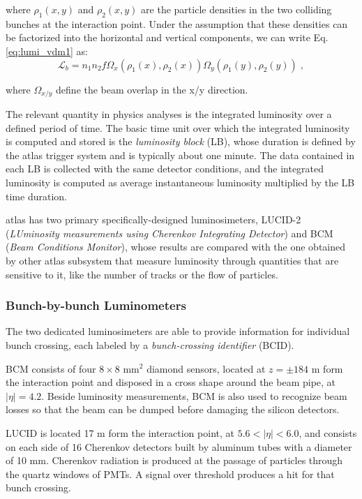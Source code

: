 where $\rho_1(x,y)$ and $\rho_2(x,y)$ are the particle densities in the two colliding bunches at the interaction point. 
Under the assumption that these densities can be factorized into the horizontal and vertical components, we can write Eq. \ref{eq:lumi_vdm1} as:
\begin{equation}
\mathcal{L}_b = n_1 n_2 f  \Omega_x(\rho_1(x), \rho_2(x)) \Omega_y(\rho_1(y), \rho_2(y))  \; ,
\label{eq:lumi_vdm1}
\end{equation}

where $\Omega_{x/y}$ define the beam overlap in the x/y direction.

The relevant quantity in physics analyses is the integrated luminosity over a defined period of time. The basic time unit over which the integrated luminosity is computed and stored is the \textit{luminosity block} (LB), whose duration is defined by the \gls{atlas} trigger system and is typically about one minute. The data contained in each LB is collected with the same detector conditions, and the integrated luminosity is computed as average instantaneous luminosity multiplied by the LB time duration.

\gls{atlas} has two primary specifically-designed luminosimeters, LUCID-2 (\textit{LUminosity measurements using Cherenkov Integrating Detector}) and BCM (\textit{Beam Conditions Monitor}), whose results are compared with the one obtained by other \gls{atlas} subsystem that measure luminosity through quantities that are sensitive to it, like the number of tracks or the flow of particles.

\subsubsection*{Bunch-by-bunch Luminometers}

The two dedicated luminosimeters are able to provide information for individual bunch crossing, each labeled by a \textit{bunch-crossing identifier} (BCID).

BCM consists of four $8 \times 8$ mm$^2$ diamond sensors, located at $z= \pm 184$ m form the interaction point and disposed in a cross shape around the beam pipe, at $|\eta| = 4.2$. Beside luminosity measurements, BCM is also used to recognize beam losses so that the beam can be dumped before damaging the silicon detectors. 

LUCID is located 17 m form the interaction point, at $5.6 < |\eta| < 6.0$, and consists on each side of 16 Cherenkov detectors built by aluminum tubes with a diameter of 10 mm. Cherenkov radiation is produced at the passage of particles through the quartz windows of PMTs. A signal over threshold produces a hit for that bunch crossing.


